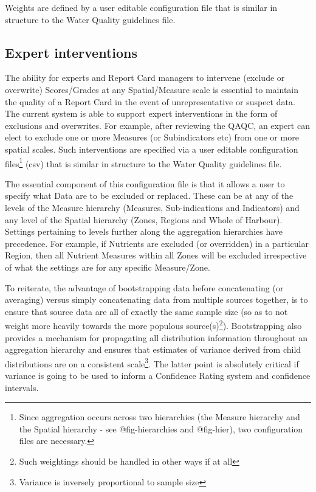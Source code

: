 \documentclass[
  8pt,
  a4paper]{article}
\begin{document}
Weights are defined by a user editable configuration file that is
similar in structure to the Water Quality guidelines file.

\subsection{Expert interventions}\label{expert-interventions}

The ability for experts and Report Card managers to intervene (exclude
or overwrite) Scores/Grades at any Spatial/Measure scale is essential to
maintain the quality of a Report Card in the event of unrepresentative
or suspect data. The current system is able to support expert
interventions in the form of exclusions and overwrites. For example,
after reviewing the QAQC, an expert can elect to exclude one or more
Measures (or Subindicators etc) from one or more spatial scales. Such
interventions are specified via a user editable configuration
files\footnote{Since aggregation occurs across two
hierarchies (the Measure hierarchy and the Spatial hierarchy - see
@fig-hierarchies and @fig-hier), two configuration files are
necessary.} (csv) that is similar in structure to the Water Quality
guidelines file.

The essential component of this configuration file is that it allows a
user to specify what Data are to be excluded or replaced. These can be
at any of the levels of the Measure hierarchy (Measures, Sub-indications
and Indicators) and any level of the Spatial hierarchy (Zones, Regions
and Whole of Harbour). Settings pertaining to levels further along the
aggregation hierarchies have precedence. For example, if Nutrients are
excluded (or overridden) in a particular Region, then all Nutrient
Measures within all Zones will be excluded irrespective of what the
settings are for any specific Measure/Zone.

To reiterate, the advantage of bootstrapping data before concatenating
(or averaging) versus simply concatenating data from multiple sources
together, is to ensure that source data are all of exactly the same
sample size (so as to not weight more heavily towards the more populous
source(s)\footnote{Such weightings should be handled in other
ways if at all}). Bootstrapping also provides a mechanism for
propagating all distribution information throughout an aggregation
hierarchy and ensures that estimates of variance derived from child
distributions are on a consistent scale\footnote{Variance is inversely
proportional to sample size}. The latter point is absolutely critical if
variance is going to be used to inform a Confidence Rating system and
confidence intervals.
\end{document}
